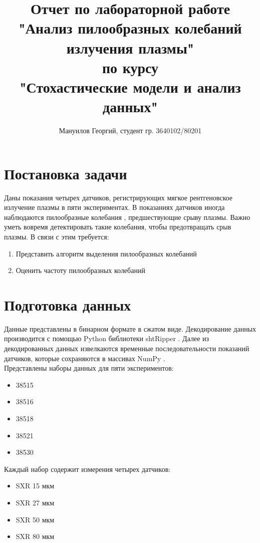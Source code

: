 \documentclass{report}
\title{
Отчет по лабораторной работе \\
{\bf "Анализ пилообразных колебаний излучения плазмы"} \\
по курсу \\
{\bf"Стохастические модели и анализ данных"}
}
\author{Мануилов Георгий, студент гр. 3640102/80201}
\date{}
\begin{document}
\maketitle

\tableofcontents

\newpage

\renewcommand\thesection{\arabic{section}}

\section{Постановка задачи}
Даны показания четырех датчиков, регистрирующих мягкое рентгеновское излучение плазмы в пяти экспериментах. В показаниях датчиков иногда наблюдаются пилообразные колебания \cite{sawtooth}, предшествующие срыву плазмы. Важно уметь вовремя детектировать такие колебания, чтобы предотвращать срыв плазмы. В связи с этим требуется:
\begin{enumerate}
    \item Представить алгоритм выделения пилообразных колебаний
    \item Оценить частоту пилообразных колебаний
\end{enumerate}

\section{Подготовка данных}
Данные представлены в бинарном формате в сжатом виде. Декодирование данных производится с помощью Python библиотеки shtRipper \cite{ripper}. Далее из декодированных данных извелкаются временные последовательности показаний датчиков, которые сохраняются в массивах NumPy \cite{numpy}.
\\

Представлены наборы данных для пяти экспериментов:
\begin{itemize}
    \item 38515
    \item 38516
    \item 38518
    \item 38521
    \item 38530
\end{itemize}

Каждый набор содержит измерения четырех датчиков:
\begin{itemize}
    \item SXR 15 мкм
    \item SXR 27 мкм
    \item SXR 50 мкм
    \item SXR 80 мкм
\end{itemize}
\end{document}
